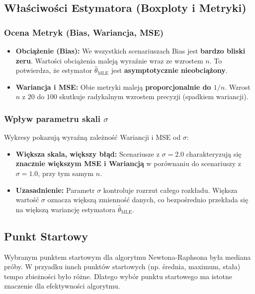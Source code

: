 \documentclass[a4paper,12pt]{article}
\begin{document}
    \subsection{Właściwości Estymatora (Boxploty i Metryki)}

    \subsubsection*{Ocena Metryk (Bias, Wariancja, MSE)}

    \begin{itemize}
        \item \textbf{Obciążenie (Bias):} We wszystkich scenariuszach Bias jest \textbf{bardzo bliski zeru}. Wartości obciążenia maleją wyraźnie wraz ze wzrostem $n$. To potwierdza, że estymator $\hat{\theta}_{\text{MLE}}$ jest \textbf{asymptotycznie nieobciążony}.
        \item \textbf{Wariancja i MSE:} Obie metryki maleją \textbf{proporcjonalnie do $1/n$}. Wzrost $n$ z $20$ do $100$ skutkuje radykalnym wzrostem precyzji (spadkiem wariancji). 
    \end{itemize}

    \subsubsection*{Wpływ parametru skali $\sigma$}
    Wykresy pokazują wyraźną zależność Wariancji i MSE od $\sigma$:
    \begin{itemize}
        \item \textbf{Większa skala, większy błąd:} Scenariusze z $\sigma = 2.0$  charakteryzują się \textbf{znacznie większym MSE i Wariancją} w porównaniu do scenariuszy z $\sigma = 1.0$, przy tym samym $n$.
        \item \textbf{Uzasadnienie:} Parametr $\sigma$ kontroluje rozrzut całego rozkładu. Większa wartość $\sigma$ oznacza większą zmienność danych, co bezpośrednio przekłada się na większą wariancję estymatora $\hat{\theta}_{\text{MLE}}$.
    \end{itemize}

    \subsection{Punkt Startowy}
    Wybranym punktem startowym dla algorytmu Newtona-Raphsona była mediana próby.
    W przyadku innch punktów startowych (np. średnia, maximum, stała) tempo zbieżności było różne. 
    Dlatego wybór punktu startowego ma istotne znaczenie dla efektywności algorytmu.
\end{document}
